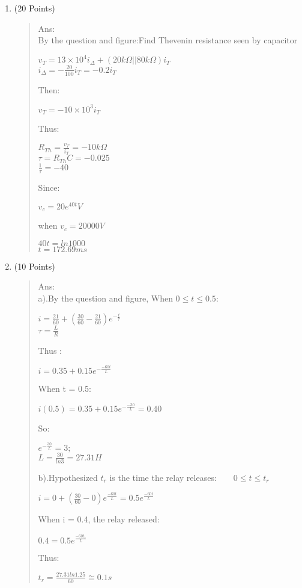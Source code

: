 \documentclass[12pt,a4paper]{article}
\begin{document}
\begin{enumerate}
		\clearpage
		\item (20 Points)
		\begin{quote}
			Ans:\\
			By the question and figure:Find Thevenin resistance seen by capacitor
			\begin{center}
				$v_T=13\times 10^4i_\Delta+(20k\Omega || 80k\Omega)i_T$\\
				$i_\Delta = -\frac{20}{100}i_T=-0.2i_T$
			\end{center}
			Then:
			\begin{center}
				$v_T=-10\times 10^3i_T$
			\end{center}
			Thus:
			\begin{center}
				$R_{Th} = \frac{v_T}{i_T}=-10k\Omega$\\
				$\tau = R_{Th}C=-0.025$\\
				$\frac{1}{\tau} = -40$
			\end{center}
			Since:
			\begin{center}
				$v_c=20e^{40t}V$
			\end{center}
			when $v_c = 20000V$
			\begin{center}
				$40t = ln1000$\\
				$t = 172.69ms$
			\end{center}
		\end{quote}
		
		\clearpage
		\item (10 Points)
		\begin{quote}
			Ans:\\
			a).By the question and figure, When $0 \leq t \leq 0.5$:
			\begin{center}
				$i = \frac{21}{60} + (\frac{30}{60}-\frac{21}{60})e^{-\frac{t}{\tau}}$\\
				$\tau = \frac{L}{R}$
			\end{center}
			Thus :
			\begin{center}
				$i=0.35+0.15e^{-\frac{-60t}{L}}$
			\end{center}
			When t = 0.5:
			\begin{center}
				$i(0.5)=0.35+0.15e^{-\frac{-30}{L}}=0.40$
			\end{center}
			So:
			\begin{center}
				$e^{-\frac{30}{L}} = 3;$\\
				$L=\frac{30}{ln3}=27.31H$	
			\end{center}
			b).Hypothesized $t_r$ is the time the relay releases:$\qquad 0 \leq t \leq t_r$
			\begin{center}
				$i=0+(\frac{30}{60}-0)e^{\frac{-60t}{L}} = 0.5e^{\frac{-60t}{L}}$
			\end{center}
			When i = 0.4, the relay released:
			\begin{center}
				$0.4=0.5e^{\frac{-60t_r}{L}}$
			\end{center}
			Thus:
			\begin{center}
				$t_r = \frac{27.31ln1.25}{60} \cong 0.1s$
			\end{center}
			 
		\end{quote}
		
		
		
		
	\end{enumerate}
\end{document}

